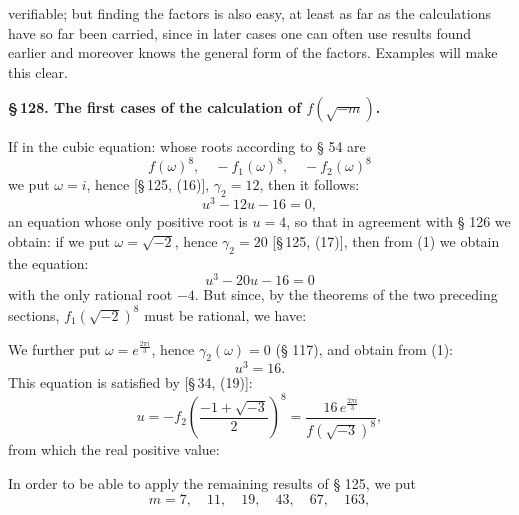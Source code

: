 verifiable; but finding the factors is also easy, at least as far as the calculations
have so far been carried, since in later cases one can often use results found earlier
and moreover knows the general form of the factors. Examples will make this clear.

\textbf{§\,128. The first cases of the calculation of $f(\sqrt{-m})$.}

If in the cubic equation:
whose roots according to § 54 are
\[
f(\omega)^8, \quad -f_1(\omega)^8, \quad -f_2(\omega)^8
\]
we put $\omega = i$, hence [§\,125, (16)], $\gamma_2 = 12$, then it follows:
\[
u^3 - 12u - 16 = 0,
\]
an equation whose only positive root is $u = 4$, so that
in agreement with § 126 we obtain:
if we put $\omega = \sqrt{-2}$, hence $\gamma_2 = 20$ [§\,125, (17)], then from (1) we obtain
the equation:
\[
u^3 - 20u - 16 = 0
\]
with the only rational root $-4$. But since, by the
theorems of the two preceding sections, $f_1(\sqrt{-2})^8$ must be
rational, we have:

We further put $\omega = e^{\frac{2\pi i}{3}}$, hence $\gamma_2(\omega) = 0$ (§ 117), and
obtain from (1):
\[
u^3 = 16.
\]
This equation is satisfied by [§\,34, (19)]:
\[
u = -f_2\left(\frac{-1+\sqrt{-3}}{2}\right)^8 = \frac{16\,e^{\frac{2\pi i}{3}}}{f(\sqrt{-3})^8},
\]
from which the real positive value:

In order to be able to apply the remaining results of § 125,
we put
\[
m = 7, \quad 11, \quad 19, \quad 43, \quad 67, \quad 163,
\]
